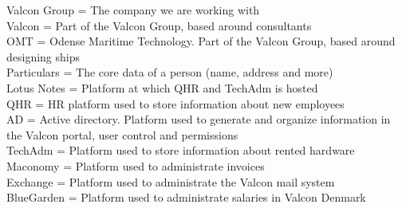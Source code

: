Valcon Group	=	The company we are working with \\
Valcon 			= 	Part of the Valcon Group, based around consultants \\
OMT 			=	Odense Maritime Technology. Part of the Valcon Group, based around designing ships \\
Particulars 	=	The core data of a person (name, address and more) \\
Lotus Notes		=	Platform at which QHR and TechAdm is hosted	\\
QHR				=	HR platform used to store information about new employees	\\
AD				=	Active directory. Platform used to generate and organize information in the Valcon portal, user control and permissions	\\
TechAdm			=	Platform used to store information about rented hardware	\\
Maconomy		=	Platform used to administrate invoices	\\
Exchange		=	Platform used to administrate the Valcon mail system	\\
BlueGarden		=	Platform used to administrate salaries in Valcon Denmark